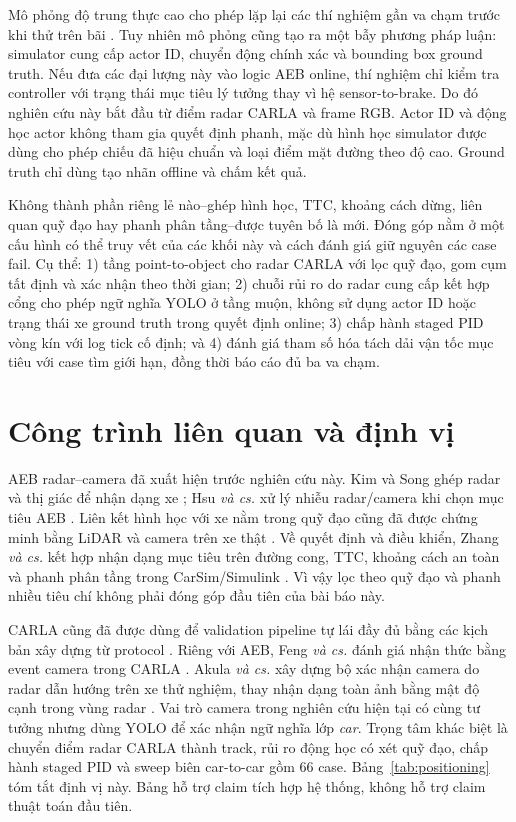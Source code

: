 \documentclass[conference]{IEEEtran}
\begin{document}
Mô phỏng độ trung thực cao cho phép lặp lại các thí nghiệm gần va chạm trước khi
thử trên bãi \cite{dosovitskiy2017carla,kang2019testing}. Tuy nhiên mô phỏng cũng
tạo ra một bẫy phương pháp luận: simulator cung cấp actor ID, chuyển động chính
xác và bounding box ground truth. Nếu đưa các đại lượng này vào logic AEB online,
thí nghiệm chỉ kiểm tra controller với trạng thái mục tiêu lý tưởng thay vì hệ
sensor-to-brake. Do đó nghiên cứu này bắt đầu từ điểm radar CARLA và frame RGB.
Actor ID và động học actor không tham gia quyết định phanh, mặc dù hình học
simulator được dùng cho phép chiếu đã hiệu chuẩn và loại điểm mặt đường theo độ
cao. Ground truth chỉ dùng tạo nhãn offline và chấm kết quả.

Không thành phần riêng lẻ nào--ghép hình học, TTC, khoảng cách dừng, liên quan
quỹ đạo hay phanh phân tầng--được tuyên bố là mới. Đóng góp nằm ở một cấu hình có
thể truy vết của các khối này và cách đánh giá giữ nguyên các case fail. Cụ thể:
1) tầng point-to-object cho radar CARLA với lọc quỹ đạo, gom cụm tất định và xác
nhận theo thời gian; 2) chuỗi rủi ro do radar cung cấp kết hợp cổng cho phép ngữ
nghĩa YOLO ở tầng muộn, không sử dụng actor ID hoặc trạng thái xe ground truth
trong quyết định online; 3) chấp hành staged PID vòng kín với log tick cố định;
và 4) đánh giá tham số hóa tách dải vận tốc mục tiêu với case tìm giới hạn, đồng
thời báo cáo đủ ba va chạm.

\section{Công trình liên quan và định vị}
AEB radar--camera đã xuất hiện trước nghiên cứu này. Kim và Song ghép radar và
thị giác để nhận dạng xe \cite{kim2013vehicle}; Hsu \emph{và cs.} xử lý nhiễu
radar/camera khi chọn mục tiêu AEB \cite{hsu2015noise}. Liên kết hình học với xe
nằm trong quỹ đạo cũng đã được chứng minh bằng LiDAR và camera trên xe thật
\cite{bae2021cipv}. Về quyết định và điều khiển, Zhang \emph{và cs.} kết hợp nhận
dạng mục tiêu trên đường cong, TTC, khoảng cách an toàn và phanh phân tầng trong
CarSim/Simulink \cite{zhang2023curved}. Vì vậy lọc theo quỹ đạo và phanh nhiều
tiêu chí không phải đóng góp đầu tiên của bài báo này.

CARLA cũng đã được dùng để validation pipeline tự lái đầy đủ bằng các kịch bản
xây dựng từ protocol \cite{gomez2022carla}. Riêng với AEB, Feng \emph{và cs.}
đánh giá nhận thức bằng event camera trong CARLA \cite{feng2025dvs}. Akula
\emph{và cs.} xây dựng bộ xác nhận camera do radar dẫn hướng trên xe thử nghiệm,
thay nhận dạng toàn ảnh bằng mật độ cạnh trong vùng radar
\cite{akula2026radarguided}. Vai trò camera trong nghiên cứu hiện tại có cùng
tư tưởng nhưng dùng YOLO để xác nhận ngữ nghĩa lớp \emph{car}. Trọng tâm khác
biệt là chuyển điểm radar CARLA thành track, rủi ro động học có xét quỹ đạo,
chấp hành staged PID và sweep biên car-to-car gồm 66 case. Bảng~\ref{tab:positioning}
tóm tắt định vị này. Bảng hỗ trợ claim tích hợp hệ thống, không hỗ trợ claim
thuật toán đầu tiên.
\end{document}
